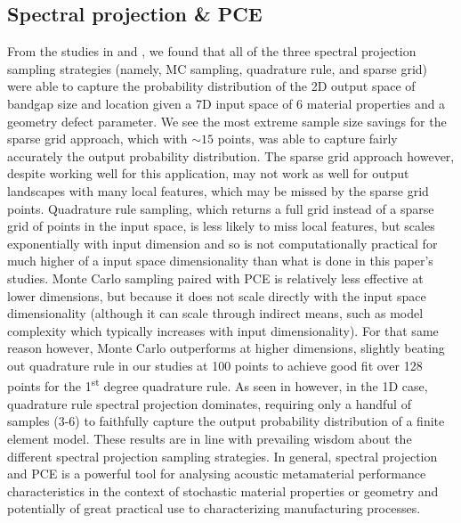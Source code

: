 \documentclass[preprint,review,12pt]{elsarticle}
\begin{document}
\subsection{Spectral projection \& PCE}
From the studies in  and , 
we found that all of the three spectral projection sampling strategies (namely, MC sampling, quadrature rule, and sparse grid) were able to capture the probability distribution of the 2D output space of bandgap size and location given a 7D input space of 6 material properties and a geometry defect parameter. We see the most extreme sample size savings for the sparse grid approach, which with \(\sim 15\) points, was able to capture fairly accurately the output probability distribution. The sparse grid approach however, despite working well for this application, may not work as well for output landscapes with many local features, which may be missed by the sparse grid points. Quadrature rule sampling, which returns a full grid instead of a sparse grid of points in the input space, is less likely to miss local features, but scales exponentially with input dimension and so is not computationally practical for much higher of a input space dimensionality than what is done in this paper's studies. Monte Carlo sampling paired with PCE is relatively less effective at lower dimensions, but because it does not scale directly with the input space dimensionality (although it can scale through indirect means, such as model complexity which typically increases with input dimensionality). For that same reason however, Monte Carlo outperforms at higher dimensions, slightly beating out quadrature rule in our studies at 100 points to achieve good fit over 128 points for the 1\textsuperscript{st} degree quadrature rule. As seen in  however, in the 1D case, quadrature rule spectral projection dominates, requiring only a handful of samples (3-6) to faithfully capture the output probability distribution of a finite element model. These results are in line with prevailing wisdom about the different spectral projection sampling strategies. In general, spectral projection and PCE is a powerful tool for analysing acoustic metamaterial performance characteristics in the context of stochastic material properties or geometry and potentially of great practical use to characterizing manufacturing processes.
\end{document}
